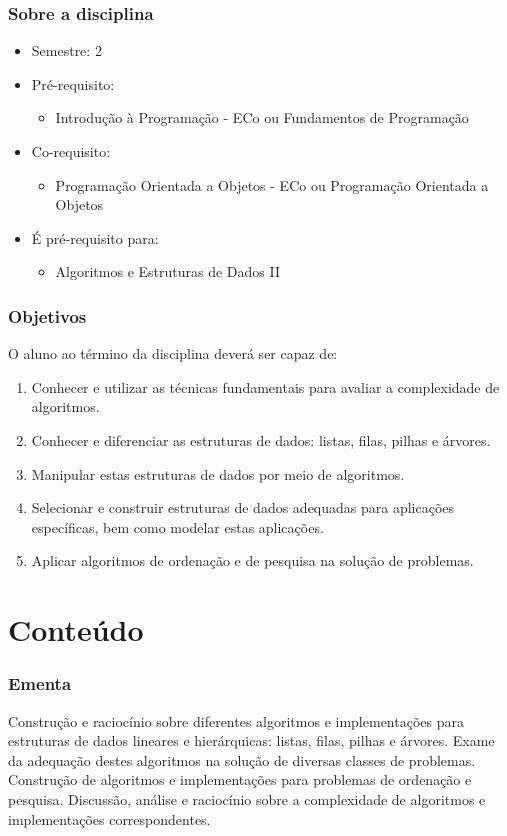 \documentclass[aspectratio=169]{beamer}
\begin{document}
\begin{frame}\frametitle{Sobre a disciplina}
\begin{itemize}
	\item Semestre: 2
	\item Pré-requisito:
		\begin{itemize}
			\item Introdução à Programação - ECo ou Fundamentos de Programação
		\end{itemize}
	\item Co-requisito:
		\begin{itemize}
			\item Programação Orientada a Objetos - ECo ou Programação Orientada a Objetos
		\end{itemize}
	\item É pré-requisito para:
		\begin{itemize}
			\item Algoritmos e Estruturas de Dados II
		\end{itemize}
\end{itemize}
\end{frame}

\begin{frame}\frametitle{Objetivos}
O aluno ao término da disciplina deverá ser capaz de:
\begin{enumerate}
	\item Conhecer e utilizar as técnicas fundamentais para avaliar a complexidade de algoritmos.
	\item Conhecer e diferenciar as estruturas de dados: listas, filas, pilhas e árvores.
	\item Manipular estas estruturas de dados por meio de algoritmos.
	\item Selecionar e construir estruturas de dados adequadas para aplicações específicas, bem como modelar estas aplicações.
	\item Aplicar algoritmos de ordenação e de pesquisa na solução de problemas.
\end{enumerate}
\end{frame}

\section{Conte\'udo}
	
\begin{frame}\frametitle{Ementa}
Construção e raciocínio sobre diferentes algoritmos e implementações para estruturas de dados lineares e hierárquicas: listas, filas, pilhas e árvores. Exame da adequação destes algoritmos na solução de diversas classes de problemas. Construção de algoritmos e implementações para problemas de ordenação e pesquisa. Discussão, análise e raciocínio sobre a complexidade de algoritmos e implementações correspondentes.
\end{frame}
\end{document}
